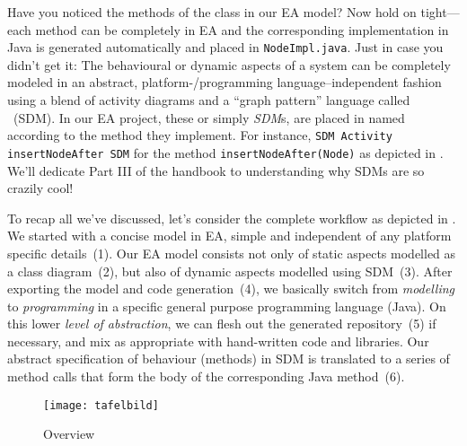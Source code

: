 Have you noticed the methods of the  class in our EA model? 
Now hold on tight---each method can be  completely in EA and the corresponding implementation in Java is generated automatically and placed in \texttt{NodeImpl.java}.
Just in case you didn't get it: The behavioural or dynamic aspects of a system can be completely modeled in an abstract, platform-/programming language--independent fashion using a blend of activity diagrams and a \enquote{graph pattern} language called ~(SDM).
In our EA project, these  or simply \emph{SDM}s, are placed in  named according to the method they implement.
For instance, \texttt{\guillemotleft{}SDM Activity\guillemotright{} insertNodeAfter SDM} for the method \texttt{in\-sert\-NodeAft\-er(Node)} as depicted in .
We'll dedicate Part III of the handbook to understanding why SDMs are so  {\huge crazily} cool!

To recap all we've discussed, let's consider the complete workflow as depicted in . We started with a concise model in EA, simple and
independent of any platform specific details~(1).  Our EA model consists not only of static aspects modelled as a class diagram~(2), but also of dynamic aspects
modelled using SDM~(3).  After exporting the model and code generation~(4), we basically switch from \emph{modelling} to \emph{programming} in a specific
general purpose programming language (Java). On this lower \emph{level of abstraction}, we can flesh out the generated repository~(5) if necessary, and mix as
appropriate with hand-written code and libraries.  Our abstract specification of behaviour (methods) in SDM is translated to a series of method calls that form
the body of the corresponding Java method~(6).

\begin{figure}[htbp]
	\centering
  \texttt{[image: tafelbild]}
	\caption{Overview}
	\label{fig:Overview}
\end{figure}


\clearpage